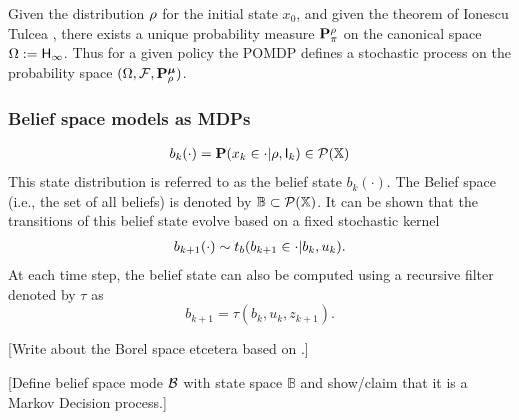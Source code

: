 \documentclass{ifacconf}
\newcommand{\red}[1]{{\color{red} #1}}
\begin{document}
 Given the distribution $\rho$ for the initial state $x_0$,  and given the theorem of Ionescu Tulcea \citep{hll1996}, there exists a unique probability measure $\mathbf{P}_\pi^\rho$ on the canonical space $\Omega:={\mathsf{H}}_\infty$. Thus for a given policy the POMDP defines a stochastic process on the probability space  
 $(\Omega,\mathcal F,\mathbf{P}_\rho^{\boldsymbol{\mu}})$.
%
%

 \subsubsection{Belief space models as MDPs}
\begin{align}
	b_k(\cdot)=\mathbf{P}(x_k\in \cdot|\rho,{\mathsf{I}}_k)\in \mathcal P ({\mathbb{X}})
\end{align}
This state distribution is referred to as the belief state $b_k(\cdot)$. 
The Belief space (i.e., the set of all beliefs) is denoted by $\mathbb{B}\subset \mathcal P({\mathbb{X}})$.
It can be shown that the transitions of this belief state evolve based on a fixed stochastic kernel
\begin{align}
	 b_{k+1}(\cdot)\sim t_b(b_{k+1}\in \cdot|b_k,u_k).
\end{align}
At each time step, the belief state can also be computed using a 
recursive filter denoted by $\tau$ as 
\[b_{k+1}=\tau(b_k,u_k,z_{k+1}).\]


\red{[Write about the Borel space etcetera based on \cite{bertsekas2004stochastic}.]}



\red{[Define belief space mode $\mathcal{B}$ with state space $\mathbb B$ and show/claim that it is a Markov Decision  process.]}
\
\end{document}
